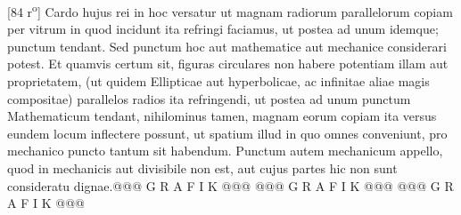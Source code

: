 [84 r\textsuperscript{o}]  Cardo hujus rei in hoc versatur ut magnam radiorum  parallelorum copiam per vitrum in quod incidunt ita  refringi faciamus, ut postea ad unum idemque; punctum  tendant. Sed punctum hoc aut mathematice aut mechanice  considerari potest. Et quamvis certum sit, figuras circulares non habere potentiam illam aut proprietatem,  (ut quidem Ellipticae aut hyperbolicae, ac infinitae aliae  magis compositae) parallelos radios ita refringendi, ut  postea ad unum punctum Mathematicum\protect{} tendant, nihilominus tamen, magnam eorum copiam ita versus eundem  locum inflectere possunt, ut spatium illud in quo omnes  conveniunt, pro mechanico puncto\protect{} tantum sit habendum. Punctum autem mechanicum\protect{} appello, quod in mechanicis  aut divisibile non est, aut cujus partes hic non sunt  consideratu dignae.\pend \pstart @@@ G R A F I K @@@%
                     @@@ G R A F I K @@@%
                     @@@ G R A F I K @@@%
                     